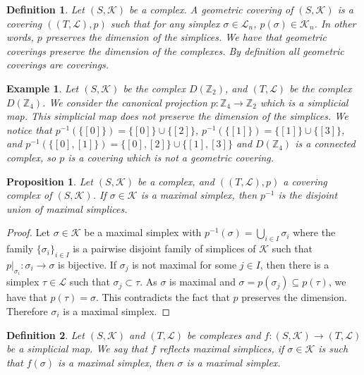 \documentclass{amsart}
\newtheorem{proposition}{Proposition}[section]
\newtheorem{definition}{Definition}[section]
\newtheorem{example}{Example}[section]
\begin{document}
\begin{definition}
Let $(S,\mathcal{K})$ be a complex. A geometric covering of $(S,\mathcal{K})$ is a covering $((T,\mathcal{L}),p)$ such that for any simplex $\sigma\in\mathcal{L}_n$, $p(\sigma)\in\mathcal{K}_n$. In other words, $p$ preserves the dimension of the simplices. We have that geometric coverings preserve the dimension of the complexes. By definition all geometric coverings are coverings.
\end{definition}

\begin{example}
Let $(S,\mathcal{K})$ be the complex $D(\mathbb{Z}_2)$, and $(T,\mathcal{L})$ be the complex  $D(\mathbb{Z}_4)$. We consider the canonical projection $p\colon \mathbb{Z}_4\longrightarrow \mathbb{Z}_2$ which is a simplicial map. This simplicial map does not preserve the dimension of the simplices.  We notice that $p^{-1}(\{[0]\})=\{[0]\}\cup\{[2]\}$, $p^{-1}(\{[1]\})=\{[1]\}\cup\{[3]\}$, and $p^{-1}(\{[0],[1]\})=\{[0],[2]\}\cup\{[1],[3]\}$ and $D(\mathbb{Z}_4)$ is a connected complex, so $p$ is a covering which is not a geometric covering.
\end{example}

\begin{proposition}
Let $(S,\mathcal{K})$ be a complex, and $((T,\mathcal{L}),p)$ a covering complex of $(S,\mathcal{K})$. If $\sigma\in\mathcal{K}$ is a maximal simplex, then $p^{-1}$ is the disjoint union of maximal simplices.
\end{proposition}

\begin{proof}
Let $\sigma\in\mathcal{K}$ be a maximal simplex with  $p^{-1}(\sigma)=\bigcup_{i\in I}\sigma_i$ where the family $\{\sigma_i\}_{i\in I}$ is a pairwise disjoint family of simplices of $\mathcal{K}$ such that $p|_{\sigma_i}\colon \sigma_i\longrightarrow \sigma$ is bijective. If $\sigma_j$ is not maximal for some $j\in I$, then there is a simplex $\tau\in\mathcal{L}$ such that $\sigma_j\subset \tau$. As $\sigma$ is maximal and $\sigma=p(\sigma_j)\subseteq p(\tau)$, we have that $p(\tau)=\sigma$. This contradicts the fact that $p$ preserves the dimension. Therefore $\sigma_i$ is a maximal simplex.
\end{proof}

\begin{definition}
Let  $(S,\mathcal{K})$ and $(T,\mathcal{L})$ be complexes and $f\colon (S,\mathcal{K})\longrightarrow (T,\mathcal{L})$ be a simplicial map. We say that $f$ reflects maximal simplices, if $\sigma\in\mathcal{K}$ is such that $f(\sigma)$ is a maximal simplex, then $\sigma$ is a maximal simplex.
\end{definition}
\end{document}

